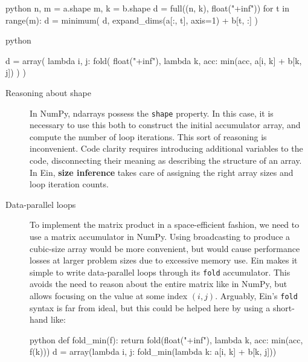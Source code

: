 \begin{center}    
\begin{minipage}[t]{.5\textwidth}
\raggedright
\begin{center}    
\begin{cminted}{python}
n, m = a.shape
m, k = b.shape
d = full((n, k), float("+inf"))
for t in range(m):
  d = minimum(
    d, 
    expand_dims(a[:, t], axis=1) + b[t, :]
  )
\end{cminted}
\end{center}
\end{minipage}%
\begin{minipage}[t]{.5\textwidth}
\raggedleft
\begin{center}    
  \begin{cminted}{python}


d = array(
  lambda i, j: fold(
    float("+inf"),
    lambda k, acc: min(acc, a[i, k] + b[k, j])
  )
)
  \end{cminted}
\end{center}
\end{minipage}
\end{center}

\begin{description}
    \item[Reasoning about shape] In NumPy, ndarrays possess the \texttt{shape} property. In this case, it is necessary to use this both to construct the initial accumulator array, and compute the number of loop iterations. This sort of reasoning is inconvenient. Code clarity requires introducing additional variables to the code, disconnecting their meaning as describing the structure of an array. In Ein, \textbf{size inference} takes care of assigning the right array sizes and loop iteration counts.
    \item[Data-parallel loops] To implement the matrix product in a space-efficient fashion, we need to use a matrix accumulator in NumPy. Using broadcasting to produce a cubic-size array would be more convenient, but would cause performance losses at larger problem sizes due to excessive memory use. Ein makes it simple to write data-parallel loops through its \texttt{fold} accumulator. This avoids the need to reason about the entire matrix like in NumPy, but allows focusing on the value at some index $(i, j)$.
    Arguably, Ein's \texttt{fold} syntax is far from ideal, but this could be helped here by using a short-hand like:
    \begin{center}        
    \begin{cminted}{python}
def fold_min(f):
    return fold(float("+inf"), lambda k, acc: min(acc, f(k)))
d = array(lambda i, j: fold_min(lambda k: a[i, k] + b[k, j]))
    \end{cminted}
    \end{center}
\end{description}

